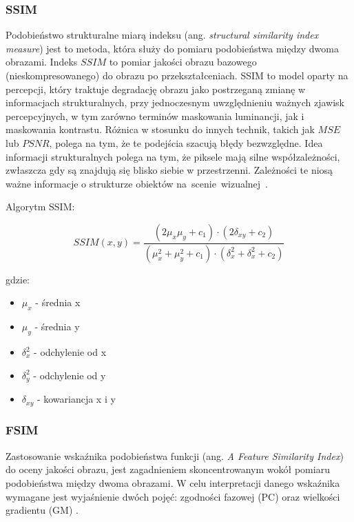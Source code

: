 \documentclass{article}
\begin{document}
\subsubsection{SSIM}

Podobieństwo strukturalne miarą indeksu (ang. \emph{structural similarity index measure}) jest to metoda, która służy 
do pomiaru podobieństwa między dwoma obrazami. Indeks $SSIM$ to pomiar jakości obrazu bazowego (nieskompresowanego) 
do obrazu po przekształceniach. SSIM to model oparty na percepcji, który traktuje degradację obrazu jako postrzeganą zmianę
w informacjach strukturalnych, przy jednoczesnym uwzględnieniu ważnych zjawisk percepcyjnych, w tym zarówno terminów maskowania 
luminancji, jak i maskowania kontrastu. Różnica w stosunku do innych technik, takich jak $MSE$ lub $PSNR$,
polega na tym, że te podejścia szacują błędy bezwzględne. Idea informacji strukturalnych polega na tym, że piksele mają silne współzależności,
zwłaszcza gdy są znajdują się blisko siebie w przestrzenni. Zależności te niosą ważne informacje o strukturze obiektów \mbox{na scenie wizualnej \cite{channappayya2008rate}.}

Algorytm SSIM:

\begin{equation}
  SSIM(x, y) = \frac{(2\mu_{x}\mu_{y} + c_{1}) \cdot (2\delta_{xy} + c_2)}{(\mu_{x}^2 + \mu_{y}^2 + c_{1}) \cdot (\delta_{x}^2 + \delta_{x}^2 + c_2)}
\end{equation}

gdzie:
\begin{itemize}[label=]
  \item $\mu_{x}$ - średnia x
  \item $\mu_{y}$ - średnia y
  \item $\delta_{x}^2$ - odchylenie od x
  \item $\delta_{y}^2$ - odchylenie od y
  \item $\delta_{xy}$ - kowariancja x i y
\end{itemize}

\subsubsection{FSIM}

Zastosowanie wskaźnika podobieństwa funkcji (ang. \emph{A Feature Similarity Index}) do oceny jakości obrazu, 
jest zagadnieniem skoncentrowanym wokół pomiaru podobieństwa między dwoma obrazami.
W celu interpretacji danego wskaźnika wymagane jest wyjaśnienie dwóch pojęć: zgodności fazowej (PC) oraz wielkości gradientu (GM) \cite{fsim_theory}.
\end{document}

